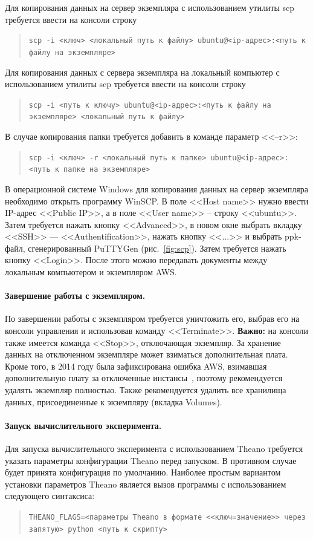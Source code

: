 \documentclass[12pt]{article}
\begin{document}
Для копирования данных на сервер экземпляра с использованием утилиты scp требуется ввести на консоли строку
\begin{quote}
\tt{scp -i <ключ> <локальный путь к файлу> ubuntu@<ip-адрес>:<путь к файлу на экземпляре> }
\end{quote}

Для копирования данных с сервера экземпляра на локальный компьютер с использованием утилиты scp требуется ввести на консоли строку
\begin{quote}
\tt{scp -i <путь к ключу> ubuntu@<ip-адрес>:<путь к файлу на экземпляре> <локальный путь к файлу> }
\end{quote}
В случае копирования папки требуется добавить в команде параметр <<--r>>:
\begin{quote}
\tt{scp -i <ключ> -r <локальный путь к папке> ubuntu@<ip-адрес>:<путь к папке на экземпляре> }
\end{quote}

В операционной системе Windows для копирования данных на сервер экземпляра необходимо открыть программу WinSCP. В поле <<Host name>> нужно ввести IP-адрес <<Public IP>>, а в поле <<User name>> -- строку <<ubuntu>>. Затем требуется нажать кнопку <<Advanced>>, в новом окне выбрать вкладку
<<SSH>> --- <<Authentification>>, нажать кнопку <<...>> и выбрать ppk-файл, сгенерированный PuTTYGen (рис.~\ref{fig:scp}). Затем требуется нажать кнопку <<Login>>. После этого можно передавать документы между локальным компьютером и экземпляром AWS.



\paragraph{Завершение работы с экземпляром.}
По завершении работы с экземпляром требуется уничтожить его, выбрав его на консоли управления и использовав команду <<Terminate>>. \textbf{Важно:} на консоли также имеется команда <<Stop>>, отключающая экземпляр. За хранение данных на отключенном экземпляре может взиматься дополнительная плата. Кроме того, в 2014 году была зафиксирована ошибка AWS, взимавшая дополнительную плату за отключенные инстансы~\cite{bug}, поэтому рекомендуется удалять экземпляр полностью. Также рекомендуется удалить все хранилища данных, присоединенные к экземпляру (вкладка Volumes).

\paragraph{Запуск вычислительного эксперимента.}
Для запуска вычислительного эксперимента с использованием Theano требуется указать параметры конфигурации Theano перед запуском. В противном случае будет принята конфигурация по умолчанию. Наиболее простым вариантом установки параметров Theano является вызов программы с использованием следующего синтаксиса:
\begin{quote}
\texttt{THEANO\_FLAGS=<параметры Theano в формате <<ключ=значение>> через запятую> python <путь к скрипту>}
\end{quote}
\end{document}
